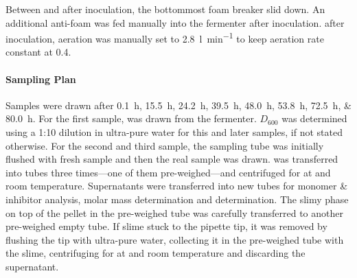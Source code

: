 Between  and  after inoculation, the bottommost foam breaker slid down. An additional  anti-foam was fed manually into the fermenter  after inoculation.  after inoculation, aeration was manually set to \SI{2.8}{\litre\per\minute} to keep aeration rate constant at \SI{0.4}{\vvm}.

\paragraph{Sampling Plan}
Samples were drawn after \SIlist{0.1;15.5;24.2;39.5;48.0;53.8;72.5;80.0}{\hour}. For the first sample,  was drawn from the fermenter. $D_{600}$ was determined using a 1:10 dilution in ultra-pure water for this and later samples, if not stated otherwise. For the second and third sample, the sampling tube was initially flushed with fresh sample and then the real sample was drawn.  was transferred into  tubes three times---one of them pre-weighed---and centrifuged for  at  and room temperature. Supernatants were transferred into new tubes for monomer \& inhibitor analysis, molar mass determination and \glc{} determination. The slimy phase on top of the pellet in the pre-weighed tube was carefully transferred to another pre-weighed empty  tube. If slime stuck to the pipette tip, it was removed by flushing the tip with ultra-pure water, collecting it in the pre-weighed tube with the slime, centrifuging for  at  and room temperature and discarding the supernatant.


